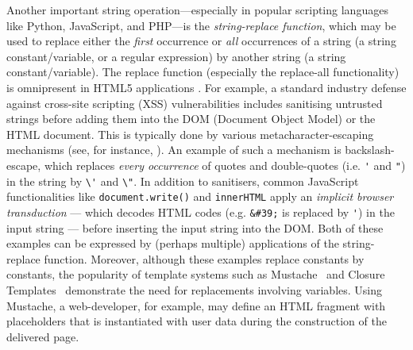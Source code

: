 Another important string operation---especially in popular scripting
languages like Python, JavaScript, and PHP---is the \emph{string-replace function}, 
which may be used to replace either the \emph{first} occurrence or
\emph{all} occurrences of a string (a string constant/variable, or a regular expression) by 
another string (a string constant/variable). The replace function (especially 
the replace-all functionality) is omnipresent in HTML5 applications
\cite{LB16,TCJ16,YABI14}. 
For example, a standard industry defense against cross-site scripting 
(XSS) vulnerabilities includes sanitising untrusted strings before adding them
into the DOM (Document Object Model) or the HTML document. 
This is typically done by %
various metacharacter-escaping mechanisms (see, for instance, 
\cite{Kern14,BEK,OWASP-XSS}). An example of such a mechanism is backslash-escape, which replaces \emph{every
occurrence} of quotes and double-quotes (i.e. \verb+'+ and \verb+"+) in the
string by \verb+\'+ and \verb+\"+. 
In addition to sanitisers, common JavaScript functionalities like \texttt{document.write()} 
and \texttt{innerHTML} apply an \emph{implicit browser transduction} --- which
decodes HTML codes (e.g. \verb+&#39;+ is replaced by \verb+'+) in the input 
string --- before inserting the input string into the DOM.
Both of these examples can be expressed by (perhaps multiple) 
applications of the string-replace function.
Moreover, although these examples replace constants by constants, the popularity of template systems such as Mustache~\cite{Mustache} and Closure Templates~\cite{Closure} demonstrate the need for replacements involving variables.
Using Mustache, a web-developer, for example, may define an HTML fragment with placeholders that is instantiated with user data during the construction of the delivered page.





